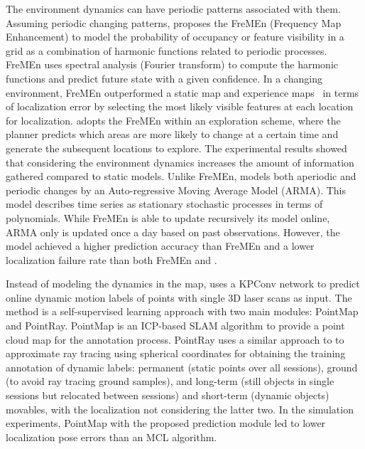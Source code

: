 The environment dynamics can have periodic patterns associated with them.
Assuming periodic changing patterns, \cite{krajník-et-al:2017:2665664} proposes the FreMEn (Frequency Map Enhancement) to model the probability of occupancy or feature visibility in a grid as a combination of harmonic functions related to periodic processes. FreMEn uses spectral analysis (Fourier transform) to compute the harmonic functions and predict future state with a given confidence. In a changing environment, FreMEn outperformed a static map and experience maps~\parencite{churchill-newman:2013:0278364913499193} in terms of localization error by selecting the most likely visible features at each location for localization.
\cite{santos-et-al:2016:2516594} adopts the FreMEn within an exploration scheme, where the planner predicts which areas are more likely to change at a certain time and generate the subsequent locations to explore. The experimental results showed that considering the environment dynamics increases the amount of information gathered compared to static models.
Unlike FreMEn, \cite{wang-et-al:2020:9468884} models both aperiodic and periodic changes by an Auto-regressive Moving Average Model (ARMA). This model describes time series as stationary stochastic processes in terms of polynomials. While FreMEn is able to update recursively its model online, ARMA only is updated once a day based on past observations. However, the model achieved a higher prediction accuracy than FreMEn and a lower localization failure rate than both FreMEn and \cite{tipaldi-et-al:2013:0278364913502830}.

Instead of modeling the dynamics in the map, \cite{thomas-et-al:2021:9561701} uses a KPConv network to predict online dynamic motion labels of points with single 3D laser scans as input. The method is a self-supervised learning approach with two main modules: PointMap and PointRay. PointMap is an ICP-based SLAM algorithm to provide a point cloud map for the annotation process. PointRay uses a similar approach to \cite{pomerleau-et-al:2014:6907397} to approximate ray tracing using spherical coordinates for obtaining the training annotation of dynamic labels: permanent (static points over all sessions), ground (to avoid ray tracing ground samples), and long-term (still objects in single sessions but relocated between sessions) and short-term (dynamic objects) movables, with the localization not considering the latter two. In the simulation experiments, PointMap with the proposed prediction module led to lower localization pose errors than an MCL algorithm.



